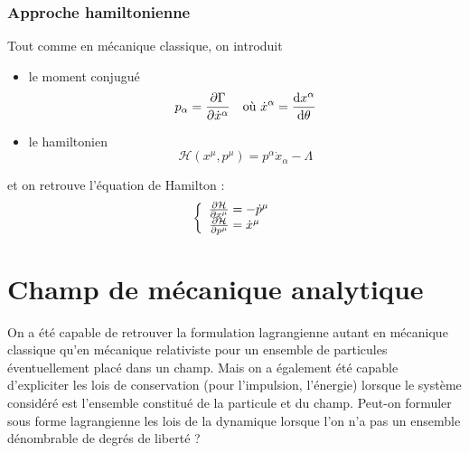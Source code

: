 \subsubsection{Approche hamiltonienne}
Tout comme en mécanique classique, on introduit 
\begin{itemize}
	\item le moment conjugué
	$$
		p_{\alpha}=\frac{\partial\Gamma}{\partial\dot{x}^{\alpha}}\text{\hspace{10pt}où 	}\dot{x}^{\alpha}=\frac{\mathrm{d} x^{\alpha}}{\mathrm{d}\theta}
	$$
	\item le hamiltonien
	$$
		\mathcal{H}(x^\mu,p^\mu)=p^{\alpha}\dot{x}_{\alpha}-\Lambda
	$$
\end{itemize}
et on retrouve l'équation de Hamilton :
$$
	\left\{ \begin{array}{r@{\;}l}
		\frac{\partial\mathcal{H}}{\partial x^\mu}&=-\dot{p}^\mu\\
		\frac{\partial\mathcal{H}}{\partial p^\mu}&=\dot{x}^\mu\\
	\end{array} \right.
$$


\section{Champ de mécanique analytique}
On a été capable de retrouver la formulation lagrangienne autant en mécanique classique qu'en mécanique relativiste pour un ensemble de particules éventuellement placé dans un champ. Mais on a également été capable d'expliciter les lois de conservation (pour l'impulsion, l'énergie) lorsque le système considéré est l'ensemble constitué de la particule et du champ. Peut-on formuler sous forme lagrangienne les lois de la dynamique lorsque l'on n'a pas un ensemble dénombrable de degrés de liberté ?